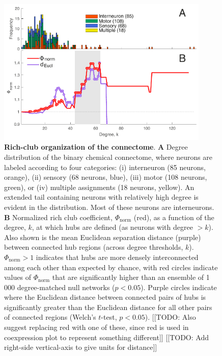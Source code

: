 \documentclass[10pt,letterpaper]{article}
\begin{document}


\begin{figure}[h]
   \centering
    \includegraphics[width=0.9\textwidth]{topologicalRCall.pdf}
 \caption{\textbf{Rich-club organization of the connectome}.
\textbf{A} Degree distribution of the binary chemical connectome, where neurons are labeled according to four categories:
(i) interneuron (85 neurons, orange),
(ii) sensory (68 neurons, blue),
(iii) motor (108 neurons, green), or
(iv) multiple assignments (18 neurons, yellow).
An extended tail containing neurons with relatively high degree is evident in the distribution.
Most of these neurons are interneurons.
\textbf{B}
Normalized rich club coefficient, $\Phi_\mathrm{norm}$ (red), as a function of the degree, $k$, at which hubs are defined (as neurons with degree $>k$).
Also shown is the mean Euclidean separation distance (purple) between connected hub regions (across degree thresholds, $k$).
$\Phi_\mathrm{norm} > 1$ indicates that hubs are more densely interconnected among each other than expected by chance, with red circles indicate values of $\Phi_\mathrm{norm}$ that are significantly higher than an ensemble of 1\,000 degree-matched null networks ($p < 0.05$).
Purple circles indicate where the Euclidean distance between connected pairs of hubs is significantly greater than the Euclidean distance for all other pairs of connected regions (Welch's $t$-test, $p < 0.05$).
[[TODO: Also suggest replacing red with one of these, since red is used in coexpression plot to represent something different]]
[[TODO: Add right-side vertical-axis to give units for distance]]
}
 \label{fig:topology_rich}
 \end{figure}
\end{document}
